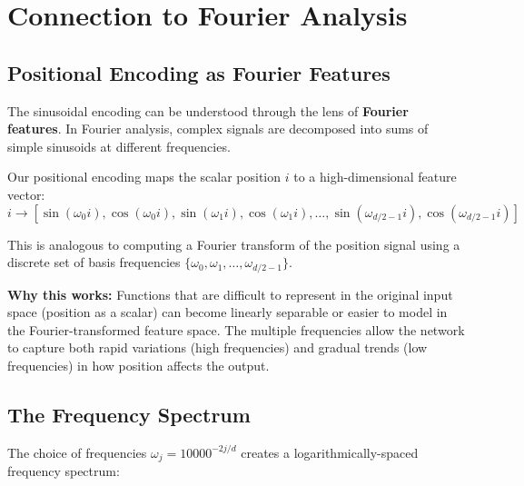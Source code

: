 \documentclass{article}
\begin{document}
\section{Connection to Fourier Analysis}

\subsection{Positional Encoding as Fourier Features}

The sinusoidal encoding can be understood through the lens of \textbf{Fourier features}. In Fourier analysis, complex signals are decomposed into sums of simple sinusoids at different frequencies.

Our positional encoding maps the scalar position $i$ to a high-dimensional feature vector:
\[
i \rightarrow \left[\sin(\omega_0 i), \cos(\omega_0 i), \sin(\omega_1 i), \cos(\omega_1 i), \ldots, \sin(\omega_{d/2-1} i), \cos(\omega_{d/2-1} i)\right]
\]

This is analogous to computing a Fourier transform of the position signal using a discrete set of basis frequencies $\{\omega_0, \omega_1, \ldots, \omega_{d/2-1}\}$.

\textbf{Why this works:} Functions that are difficult to represent in the original input space (position as a scalar) can become linearly separable or easier to model in the Fourier-transformed feature space. The multiple frequencies allow the network to capture both rapid variations (high frequencies) and gradual trends (low frequencies) in how position affects the output.

\subsection{The Frequency Spectrum}

The choice of frequencies $\omega_j = 10000^{-2j/d}$ creates a logarithmically-spaced frequency spectrum:

\begin{center}
\end{center}
\end{document}
